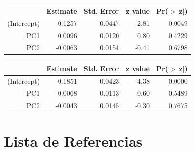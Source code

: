 \documentclass[a4paper,12pt]{Latex/Classes/PhDthesisPSnPDF}
\begin{document}
\begin{center}
\begin{table}[ht]
\centering
\begin{tabular}{rrrrr}
  \hline
 & Estimate & Std. Error & z value & Pr($>$$|$z$|$) \\ 
  \hline
(Intercept) & -0.1257 & 0.0447 & -2.81 & 0.0049 \\ 
  PC1 & 0.0096 & 0.0120 & 0.80 & 0.4229 \\ 
  PC2 & -0.0063 & 0.0154 & -0.41 & 0.6798 \\ 
   \hline
\end{tabular}
\end{table}\end{center}
\begin{center}
\begin{table}[ht]
\centering
\begin{tabular}{rrrrr}
  \hline
 & Estimate & Std. Error & z value & Pr($>$$|$z$|$) \\ 
  \hline
(Intercept) & -0.1851 & 0.0423 & -4.38 & 0.0000 \\ 
  PC1 & 0.0068 & 0.0113 & 0.60 & 0.5489 \\ 
  PC2 & -0.0043 & 0.0145 & -0.30 & 0.7675 \\ 
   \hline
\end{tabular}
\end{table}\end{center}


\chapter*{Lista de Referencias}
\end{document}
